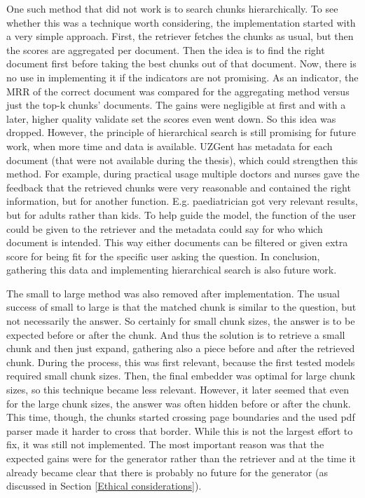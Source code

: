 One such method that did not work is to search chunks hierarchically. To see whether this was a technique worth considering, the implementation started with a very simple approach. First, the retriever fetches the chunks as usual, but then the scores are aggregated per document. Then the idea is to find the right document first before taking the best chunks out of that document. Now, there is no use in implementing it if the indicators are not promising. As an indicator, the MRR of the correct document was compared for the aggregating method versus just the top-k chunks' documents. The gains were negligible at first and with a later, higher quality validate set the scores even went down. So this idea was dropped. However, the principle of hierarchical search is still promising for future work, when more time and data is available. UZGent has metadata for each document (that were not available during the thesis), which could strengthen this method. For example, during practical usage multiple doctors and nurses gave the feedback that the retrieved chunks were very reasonable and contained the right information, but for another function. E.g. paediatrician got very relevant results, but for adults rather than kids. To help guide the model, the function of the user could be given to the retriever and the metadata could say for who which document is intended. This way either documents can be filtered or given extra score for being fit for the specific user asking the question. In conclusion, gathering this data and implementing hierarchical search is also future work.

The small to large method was also removed after implementation. The usual success of small to large is that the matched chunk is similar to the question, but not necessarily the answer. So certainly for small chunk sizes, the answer is to be expected before or after the chunk. And thus the solution is to retrieve a small chunk and then just expand, gathering also a piece before and after the retrieved chunk. During the process, this was first relevant, because the first tested models required small chunk sizes. Then, the final embedder was optimal for large chunk sizes, so this technique became less relevant. However, it later seemed that even for the large chunk sizes, the answer was often hidden before or after the chunk. This time, though, the chunks started crossing page boundaries and the used pdf parser made it harder to cross that border. While this is not the largest effort to fix, it was still not implemented. The most important reason was that the expected gains were for the generator rather than the retriever and at the time it already became clear that there is probably no future for the generator (as discussed in Section \ref{Ethical considerations}).

